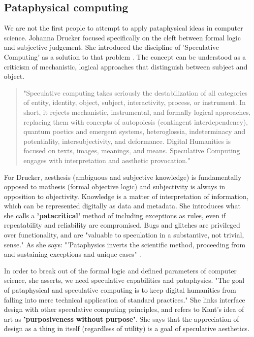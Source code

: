 \subsection{Pataphysical computing}

We are not the first people to attempt to apply pataphysical ideas in computer science. Johanna Drucker focused specifically on the cleft between formal logic and subjective judgement. She introduced the discipline of 'Speculative Computing' as a solution to that problem \citep{Drucker2007}. The concept can be understood as a criticism of mechanistic, logical approaches that distinguish between subject and object.

\begin{quote}
  "Speculative computing takes seriously the destabilization of all categories of entity, identity, object, subject, interactivity, process, or instrument. In short, it rejects mechanistic, instrumental, and formally logical approaches, replacing them with concepts of autopoiesis (contingent interdependency), quantum poetics and emergent systems, heteroglossia, indeterminacy and potentiality, intersubjectivity, and deformance. Digital Humanities is focused on texts, images, meanings, and means. Speculative Computing engages with interpretation and aesthetic provocation." \citep[p.29]{Drucker2009}
\end{quote}

For Drucker, aesthesis (ambiguous and subjective knowledge) is fundamentally opposed to mathesis (formal objective logic) and subjectivity is always in opposition to objectivity. Knowledge is a matter of interpretation of information, which can be represented digitally as data and metadata. She introduces what she calls a \textbf{'patacritical'} method of including exceptions as rules, even if repeatability and reliability are compromised. Bugs and glitches are privileged over functionality, and are "valuable to speculation in a substantive, not trivial, sense." As she says: "'Pataphysics inverts the scientific method, proceeding from and sustaining exceptions and unique cases" \citep{Drucker2007}.

In order to break out of the formal logic and defined parameters of computer science, she asserts, we need speculative capabilities and pataphysics. "The goal of pataphysical and speculative computing is to keep digital humanities from falling into mere technical application of standard practices." She links interface design with other speculative computing principles, and refers to Kant's idea of art as \textbf{'purposiveness without purpose'}. She says that the appreciation of design as a thing in itself (regardless of utility) is a goal of speculative aesthetics.

